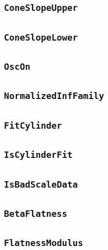 \documentclass[11pt]{amsart}
\theoremstyle{definition}
\begin{document}
\subsection{\texorpdfstring{\texttt{ConeSlopeUpper}}{ConeSlopeUpper}}\label{node:ConeSlopeUpper}


\subsection{\texorpdfstring{\texttt{ConeSlopeLower}}{ConeSlopeLower}}\label{node:ConeSlopeLower}


\subsection{\texorpdfstring{\texttt{OscOn}}{OscOn}}\label{node:OscOn}


\subsection{\texorpdfstring{\texttt{NormalizedInfFamily}}{NormalizedInfFamily}}\label{node:NormalizedInfFamily}


\subsection{\texorpdfstring{\texttt{FitCylinder}}{FitCylinder}}\label{node:FitCylinder}


\subsection{\texorpdfstring{\texttt{IsCylinderFit}}{IsCylinderFit}}\label{node:IsCylinderFit}


\subsection{\texorpdfstring{\texttt{IsBadScaleData}}{IsBadScaleData}}\label{node:IsBadScaleData}


\subsection{\texorpdfstring{\texttt{BetaFlatness}}{BetaFlatness}}\label{node:BetaFlatness}


\subsection{\texorpdfstring{\texttt{FlatnessModulus}}{FlatnessModulus}}\label{node:FlatnessModulus}

\end{document}

